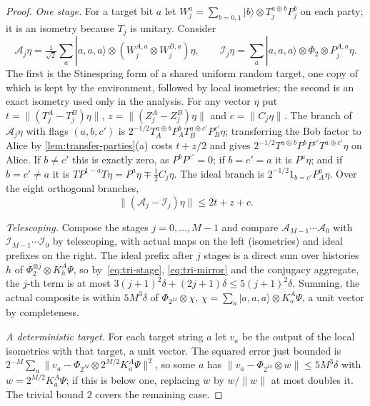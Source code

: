 \begin{proof}
\emph{One stage.} For a target bit $a$ let $W_j^{a}=\sum_{b=0,1}|b\rangle\otimes T_j^{a\oplus b}P_j^b$ on each party; it is
an isometry because $T_j$ is unitary. Consider
\[
\mathcal A_j\eta=\tfrac1{\sqrt2}\sum_a|a,a,a\rangle\otimes(W_j^{A,a}\otimes W_j^{B,a})\eta,\qquad
\mathcal I_j\eta=\sum_a|a,a,a\rangle\otimes\Phi_2\otimes P_j^{A,a}\eta .
\]
The first is the Stinespring form of a shared uniform random target, one copy of which is kept by the environment,
followed by local isometries; the second is an exact isometry used only in the analysis. For any vector $\eta$ put
$t=\|(T^A_j-T^B_j)\eta\|$, $z=\|(Z^A_j-Z^B_j)\eta\|$ and $c=\|C_j\eta\|$. The branch of $\mathcal A_j\eta$ with flags
$(a,b,c')$ is $2^{-1/2}T_A^{a\oplus b}P^b_AT_B^{a\oplus c'}P^{c'}_B\eta$; transferring the Bob factor to Alice by
\cref{lem:transfer-parties}(a) costs $t+z/2$ and gives $2^{-1/2}T^{a\oplus b}P^bP^{c'}T^{a\oplus c'}\eta$ on Alice. If
$b\ne c'$ this is exactly zero, as $P^bP^{c'}=0$; if $b=c'=a$ it is $P^a\eta$; and if $b=c'\ne a$ it is
$TP^{1-a}T\eta=P^a\eta\mp\frac12C_j\eta$. The ideal branch is $2^{-1/2}1_{b=c'}P^a_A\eta$. Over the eight orthogonal branches,
\begin{equation}\label{eq:tri-stage}
\|(\mathcal A_j-\mathcal I_j)\eta\|\le2t+z+c .
\end{equation}

\emph{Telescoping.} Compose the stages $j=0,\dots,M-1$ and compare $\mathcal A_{M-1}\cdots\mathcal A_0$ with
$\mathcal I_{M-1}\cdots\mathcal I_0$ by telescoping, with actual maps on the left (isometries) and ideal prefixes on the
right. The ideal prefix after $j$ stages is a direct sum over histories $h$ of $\Phi_2^{\otimes j}\otimes K^A_h\Psi$, so
by~\eqref{eq:tri-stage}, \eqref{eq:tri-mirror} and the conjugacy aggregate, the $j$-th term is at most
$3(j+1)^2\delta+(2j+1)\delta\le5(j+1)^2\delta$. Summing, the actual composite is within $5M^3\delta$ of
$\Phi_{2^M}\otimes\chi$, $\chi=\sum_a|a,a,a\rangle\otimes K^A_a\Psi$, a unit vector by completeness.

\emph{A deterministic target.} For each target string $a$ let $v_a$ be the output of the local isometries with that target,
a unit vector. The squared error just bounded is $2^{-M}\sum_a\|v_a-\Phi_{2^M}\otimes2^{M/2}K^A_a\Psi\|^2$, so some $a$ has
$\|v_a-\Phi_{2^M}\otimes w\|\le5M^3\delta$ with $w=2^{M/2}K^A_a\Psi$; if this is below one, replacing $w$ by $w/\|w\|$
at most doubles it. The trivial bound $2$ covers the remaining case.
\end{proof}

